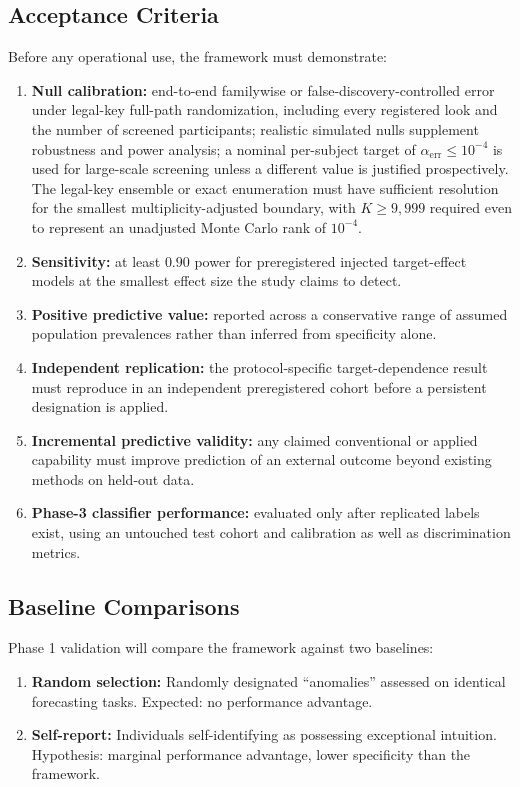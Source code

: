 \documentclass[11pt,letterpaper]{article}
\begin{document}
\subsection{Acceptance Criteria}
\label{sec:acceptance}
Before any operational use, the framework must demonstrate:
\begin{enumerate}[nosep]
    \item \textbf{Null calibration:} end-to-end familywise or false-discovery-controlled error under legal-key full-path randomization, including every registered look and the number of screened participants; realistic simulated nulls supplement robustness and power analysis; a nominal per-subject target of $\alpha_{\mathrm{err}}\leq10^{-4}$ is used for large-scale screening unless a different value is justified prospectively. The legal-key ensemble or exact enumeration must have sufficient resolution for the smallest multiplicity-adjusted boundary, with $K\geq9{,}999$ required even to represent an unadjusted Monte Carlo rank of $10^{-4}$.
    \item \textbf{Sensitivity:} at least $0.90$ power for preregistered injected target-effect models at the smallest effect size the study claims to detect.
    \item \textbf{Positive predictive value:} reported across a conservative range of assumed population prevalences rather than inferred from specificity alone.
    \item \textbf{Independent replication:} the protocol-specific target-dependence result must reproduce in an independent preregistered cohort before a persistent designation is applied.
    \item \textbf{Incremental predictive validity:} any claimed conventional or applied capability must improve prediction of an external outcome beyond existing methods on held-out data.
    \item \textbf{Phase-3 classifier performance:} evaluated only after replicated labels exist, using an untouched test cohort and calibration as well as discrimination metrics.
\end{enumerate}

\subsection{Baseline Comparisons}

Phase 1 validation will compare the framework against two baselines:

\begin{enumerate}
    \item \textbf{Random selection:} Randomly designated ``anomalies'' assessed on identical forecasting tasks. Expected: no performance advantage.
    \item \textbf{Self-report:} Individuals self-identifying as possessing exceptional intuition. Hypothesis: marginal performance advantage, lower specificity than the framework.
\end{enumerate}
\end{document}
